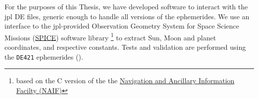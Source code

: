 For the purposes of this Thesis, we have developed software to interact with the 
\gls{jpl} DE files, generic enough to handle all versions of the ephemerides. 
We use an interface to the \gls{jpl}-provided Observation Geometry System
for Space Science Missions (\href{https://naif.jpl.nasa.gov/naif/}{SPICE}) 
software library \footnote{based on the C version of the the 
\href{https://naif.jpl.nasa.gov/naif/toolkit_C.html}{Navigation and Ancillary Information Facilty (NAIF)}} 
to extract Sun, Moon and planet coordinates, and respective constants. Tests and 
validation are performed using the \texttt{DE421} ephemerides (\cite{Folkner2009}).
